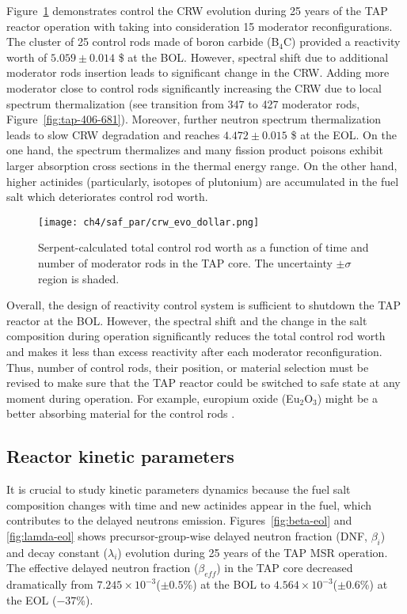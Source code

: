 Figure~\ref{fig:crw-evo} demonstrates control the CRW evolution during 25 
years of the \gls{TAP} reactor operation with taking into consideration 15 
moderator reconfigurations. The cluster of 25 control rods made of boron 
carbide (B$_4$C) provided a reactivity worth of $5.059\pm0.014$ \$ at the 
\gls{BOL}. However, spectral shift 
due to additional moderator rods insertion leads to significant change in 
the CRW. Adding more moderator close to control rods significantly increasing 
the CRW due to local spectrum thermalization (see transition from 347 to 427 
moderator rods, Figure~\ref{fig:tap-406-681}). Moreover, further neutron 
spectrum thermalization leads to slow CRW degradation and reaches 
$4.472\pm0.015$ \$ at the \gls{EOL}. On the one hand, the spectrum thermalizes 
and many fission product poisons exhibit larger absorption cross sections in 
the thermal energy range. On the other hand, higher actinides (particularly, 
isotopes of plutonium) are accumulated in the fuel salt which deteriorates 
control rod worth.
\begin{figure}[htp!] %
	\centering
	\texttt{[image: ch4/saf\_par/crw\_evo\_dollar.png]}
	\caption{Serpent-calculated total control rod worth as a function 
		of time and number of moderator rods in the \gls{TAP} core. The 
		uncertainty $\pm\sigma$ region is shaded.}
	\label{fig:crw-evo}
\end{figure}

Overall, the design of reactivity control system is sufficient to shutdown the 
\gls{TAP} reactor at the \gls{BOL}. However, the spectral shift and the change 
in the salt composition during operation significantly reduces the total 
control rod worth and makes it less than excess reactivity after each 
moderator reconfiguration. Thus, number of control rods, their position, or 
material selection must be revised to make sure that the \gls{TAP} reactor 
could be switched to safe state at any moment during operation. For example, 
europium oxide (Eu$_2$O$_3$) might be a better absorbing material for the 
control rods \cite{ashraf_preliminary_2020-1}.


\subsection{Reactor kinetic parameters}
It is crucial to study kinetic parameters dynamics because the fuel salt 
composition changes with time and new actinides appear in the fuel, which 
contributes to the delayed neutrons emission. Figures~\ref{fig:beta-eol} and 
\ref{fig:lamda-eol} shows precursor-group-wise delayed neutron fraction (DNF, 
$\beta_i$) and decay constant ($\lambda_i$) evolution during 25 years of the 
\gls{TAP} \gls{MSR} operation. The effective delayed neutron fraction 
($\beta_{eff}$) in the \gls{TAP} core decreased dramatically from 
$7.245\times10^{-3}$($\pm0.5$\%) at the \gls{BOL} to 
$4.564\times10^{-3}$($\pm0.6$\%) at the \gls{EOL} ($-37$\%). 

